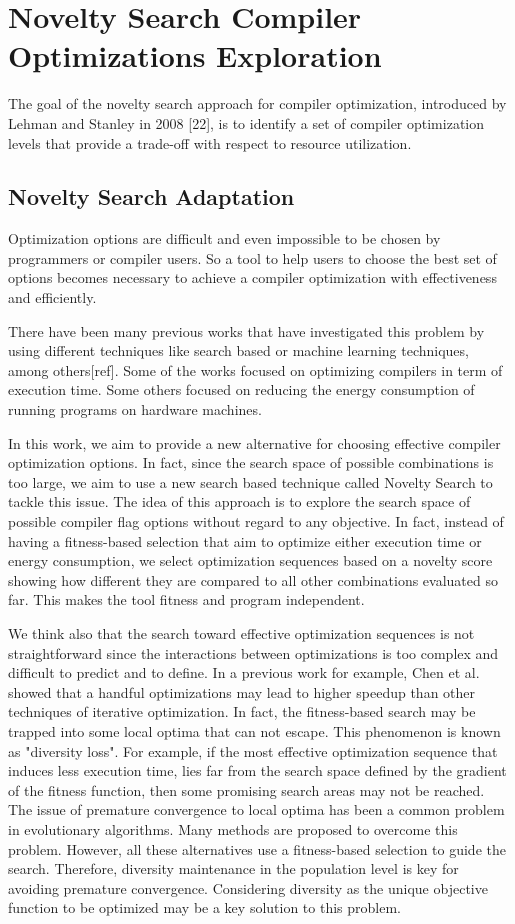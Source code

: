 \section{Novelty Search Compiler Optimizations Exploration}
 
The goal of the novelty search approach for compiler optimization, introduced by Lehman and Stanley in 2008
[22], is to identify a set of compiler optimization levels that provide a trade-off with respect to resource utilization. 

\subsection{Novelty Search Adaptation}
Optimization options are difficult and even impossible to be chosen by programmers or compiler users. So a tool to help users to choose the best set of options becomes necessary to achieve a compiler optimization with effectiveness and efficiently. 

There have been many previous works that have investigated this problem by using different techniques like search based or machine learning techniques, among others[ref]. Some of the works focused on optimizing compilers in term of execution time. Some others focused on reducing the energy consumption of running programs on hardware machines.

In this work, we aim to provide a new alternative for choosing effective compiler optimization options. In fact, since the search space of possible combinations is too large, we aim to use a new search based technique called Novelty Search to tackle this issue. The idea of this approach is to explore the search space of possible compiler flag options without regard to any objective. In fact, instead of having a fitness-based selection that aim to optimize either execution time or energy consumption, we select optimization sequences based on a novelty score showing how different they are compared to all other combinations evaluated so far. This makes the tool fitness and program independent.

We think also that the search toward effective optimization sequences is not straightforward since the interactions between optimizations is too complex and difficult to predict and to define. In a previous work for example, Chen et al. \cite{chen2012deconstructing}showed that a handful optimizations may lead to higher speedup than other techniques of iterative optimization. In fact, the fitness-based search may be trapped into some local optima that can not escape. This phenomenon is known as "diversity loss". For example, if the most effective optimization sequence that induces less execution time, lies far from the search space defined by the gradient of the fitness function, then some promising search areas may not be reached. The issue of premature convergence to local optima has been a common problem in evolutionary algorithms. Many methods are proposed to overcome this
problem. However, all these alternatives use a fitness-based selection to guide the search. 
Therefore, diversity maintenance in the population level is key for avoiding premature convergence. Considering diversity as the unique objective function to be optimized may be a key solution to this problem.

